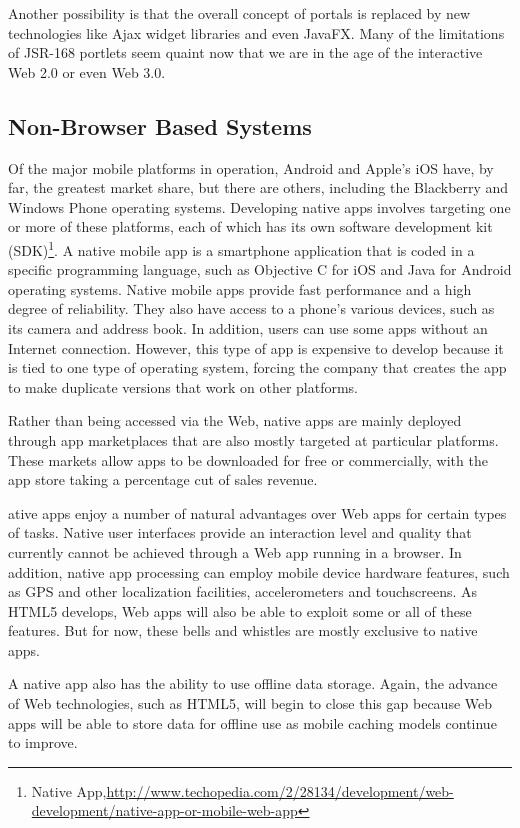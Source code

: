 	Another possibility is that the overall concept of portals is replaced by new technologies like Ajax widget libraries and even JavaFX. Many of the limitations of JSR-168 portlets seem quaint now that we are in the age of the interactive Web 2.0 or even Web 3.0.

\subsection{Non-Browser Based Systems}
Of the major mobile platforms in operation, Android and Apple's iOS have, by far, the greatest market share, but there are others, including the Blackberry and Windows Phone operating systems. Developing native apps involves targeting one or more of these platforms, each of which has its own software development kit (SDK)\footnote{Native App,\url{http://www.techopedia.com/2/28134/development/web-development/native-app-or-mobile-web-app}}.
A native mobile app is a smartphone application that is coded in a specific programming language, such as Objective C for iOS and Java for Android operating systems. Native mobile apps provide fast performance and a high degree of reliability. They also have access to a phone's various devices, such as its camera and address book. In addition, users can use some apps without an Internet connection. However, this type of app is expensive to develop because it is tied to one type of operating system, forcing the company that creates the app to make duplicate versions that work on other platforms.

Rather than being accessed via the Web, native apps are mainly deployed through app marketplaces that are also mostly targeted at particular platforms. These markets allow apps to be downloaded for free or commercially, with the app store taking a percentage cut of sales revenue.

ative apps enjoy a number of natural advantages over Web apps for certain types of tasks. Native user interfaces provide an interaction level and quality that currently cannot be achieved through a Web app running in a browser. In addition, native app processing can employ mobile device hardware features, such as GPS and other localization facilities, accelerometers and touchscreens. As HTML5 develops, Web apps will also be able to exploit some or all of these features. But for now, these bells and whistles are mostly exclusive to native apps.

A native app also has the ability to use offline data storage. Again, the advance of Web technologies, such as HTML5, will begin to close this gap because Web apps will be able to store data for offline use as mobile caching models continue to improve.

